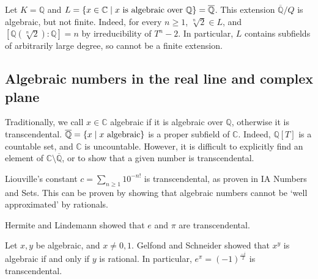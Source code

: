 \begin{example}
	Let \( K = \mathbb Q \) and \( L = \qty{x \in \mathbb C \mid x \text{ is algebraic over } \mathbb Q} = \overline{\mathbb Q} \).
	This extension \( \overline{\mathbb Q}/Q \) is algebraic, but not finite.
	Indeed, for every \( n \geq 1 \), \( \sqrt[n]{2} \in L \), and \( [\mathbb Q(\sqrt[n]{2}):\mathbb Q] = n \) by irreducibility of \( T^n - 2 \).
	In particular, \( L \) contains subfields of arbitrarily large degree, so cannot be a finite extension.
\end{example}

\subsection{Algebraic numbers in the real line and complex plane}
Traditionally, we call \( x \in \mathbb C \) algebraic if it is algebraic over \( \mathbb Q \), otherwise it is transcendental.
\( \overline{\mathbb Q} = \qty{x \mid x \text{ algebraic}} \) is a proper subfield of \( \mathbb C \).
Indeed, \( \mathbb Q[T] \) is a countable set, and \( \mathbb C \) is uncountable.
However, it is difficult to explicitly find an element of \( \mathbb C \setminus \overline{\mathbb Q} \), or to show that a given number is transcendental.
\begin{example}
	Liouville's constant \( c = \sum_{n \geq 1} 10^{-n!} \) is transcendental, as proven in IA Numbers and Sets.
	This can be proven by showing that algebraic numbers cannot be `well approximated' by rationals.
\end{example}
\begin{example}
	Hermite and Lindemann showed that \( e \) and \( \pi \) are transcendental.
\end{example}
\begin{example}
	Let \( x, y \) be algebraic, and \( x \neq 0,1 \).
	Gelfond and Schneider showed that \( x^y \) is algebraic if and only if \( y \) is rational.
	In particular, \( e^\pi = (-1)^{\frac{-i}{2}} \) is transcendental.
\end{example}
